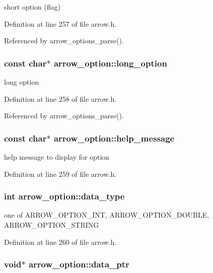 short option (flag) 

Definition at line 257 of file arrow.h.

Referenced by arrow\_\-options\_\-parse().\hypertarget{structarrow__option_3d8ddc7b0d627a15c7108e21a16cb51a}{
\subsubsection{\setlength{\rightskip}{0pt plus 5cm}const char$\ast$ {\bf arrow\_\-option::long\_\-option}}}
\label{structarrow__option_3d8ddc7b0d627a15c7108e21a16cb51a}


long option 

Definition at line 258 of file arrow.h.

Referenced by arrow\_\-options\_\-parse().\hypertarget{structarrow__option_48bfe5bda71cd04d92067b203ffb92ce}{
\subsubsection{\setlength{\rightskip}{0pt plus 5cm}const char$\ast$ {\bf arrow\_\-option::help\_\-message}}}
\label{structarrow__option_48bfe5bda71cd04d92067b203ffb92ce}


help message to display for option 

Definition at line 259 of file arrow.h.\hypertarget{structarrow__option_c97df040be0b7c76e92556087be21ff8}{
\subsubsection{\setlength{\rightskip}{0pt plus 5cm}int {\bf arrow\_\-option::data\_\-type}}}
\label{structarrow__option_c97df040be0b7c76e92556087be21ff8}


one of ARROW\_\-OPTION\_\-INT, ARROW\_\-OPTION\_\-DOUBLE, ARROW\_\-OPTION\_\-STRING 

Definition at line 260 of file arrow.h.\hypertarget{structarrow__option_0b4e8cc50fdb7d8fbb1e63db30cd172d}{
\subsubsection{\setlength{\rightskip}{0pt plus 5cm}void$\ast$ {\bf arrow\_\-option::data\_\-ptr}}}
\label{structarrow__option_0b4e8cc50fdb7d8fbb1e63db30cd172d}


